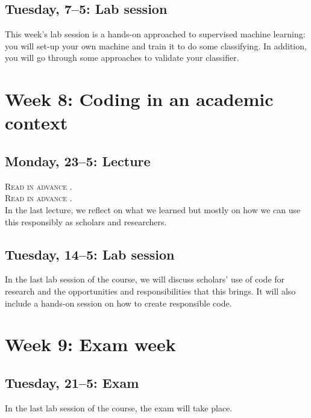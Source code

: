 \subsection*{Tuesday, 7--5: Lab session}
This week's lab session is a hands-on approached to supervised machine learning: you will set-up your own machine and train it to do some classifying. In addition, you will go through some approaches to validate your classifier.

\section*{Week 8: Coding in an academic context}

\subsection*{Monday, 23--5: Lecture}
\textsc{ Read in advance \cite{bender_dangers_2021}.} \\
\textsc{ Read in advance \cite{lissack_slodderwetenschap_2021}.} \\

In the last lecture, we reflect on what we learned but mostly on how we can use this responsibly as scholars and researchers. 

\subsection*{Tuesday, 14--5: Lab session}
In the last lab session of the course, we will discuss scholars' use of code for research and the opportunities and responsibilities that this brings. It will also include a hands-on session on how to create responsible code.

\section*{Week 9: Exam week}

\subsection*{Tuesday, 21--5: Exam}
In the last lab session of the course, the exam will take place. 









